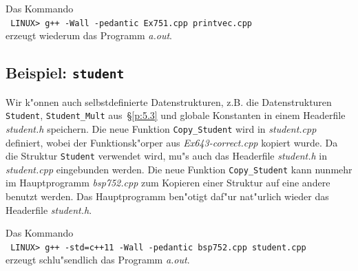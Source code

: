 \begin{minipage}{\textwidth}
Das Kommando
\\[0.2ex]
\verb| LINUX> g++ -Wall -pedantic Ex751.cpp printvec.cpp |
\\[0.2ex]
erzeugt wiederum das Programm \textit{a.out}.
\end{minipage}
%
%
\subsection{Beispiel: \texttt{student}}
\label{p:7.5.2}
%
Wir k"onnen auch selbstdefinierte Datenstrukturen, z.B.
die Datenstrukturen \texttt{Student}, \texttt{Student\_Mult}
aus~\S\ref{p:5.3} 
und globale Konstanten
in einem Headerfile \textit{student.h} speichern.
%
%
Die neue Funktion \texttt{Copy\_Student} wird in
\textit{student.cpp} definiert,
wobei der Funktionsk"orper aus \textit{Ex643-correct.cpp} kopiert wurde.
%
Da die Struktur \texttt{Student} verwendet wird, mu"s auch das
Headerfile \textit{student.h} in \textit{student.cpp} eingebunden werden.
Die neue Funktion \texttt{Copy\_Student} kann nunmehr im Hauptprogramm
\textit{bsp752.cpp}  zum Kopieren einer Struktur auf eine andere
benutzt werden. Das Hauptprogramm ben"otigt daf"ur nat"urlich wieder
das Headerfile \textit{student.h}.

Das Kommando
\\[0.2ex]
\verb| LINUX> g++ -std=c++11 -Wall -pedantic bsp752.cpp student.cpp  |
\\[0.2ex]
erzeugt schlu"sendlich das Programm \textit{a.out}.
\\ \vfill\mbox{}
%
%
